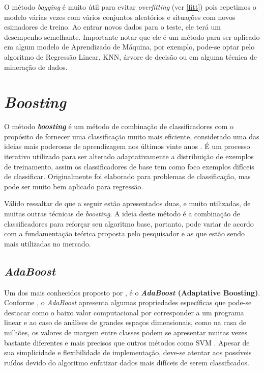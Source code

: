 \documentclass[
  openany]{book}
\begin{document}
O método \emph{bagging} é muito útil para evitar \emph{overfitting} (ver \ref{fitt}) pois repetimos o modelo várias vezes com vários conjuntos aleatórios e situações com novos esimadores de treino. Ao entrar novos dados para o teste, ele terá um desempenho semelhante. Importante notar que ele é um método para ser aplicado em algum modelo de Aprendizado de Máquina, por exemplo, pode-se optar pelo algoritmo de Regressão Linear, KNN, árvore de decisão ou em alguma técnica de mineração de dados.

\hypertarget{boost}{%
\section{\texorpdfstring{\emph{Boosting}}{Boosting}}\label{boost}}

O método \textbf{\emph{boosting}} \citep{freund1996experiments} é um método de combinação de classificadores com o propósito de fornecer uma classificação muito mais eficiente, considerado uma das ideias mais poderosas de aprendizagem nos últimos vinte anos \citep{hastie2009elements}. É um processo iterativo utilizado para ser alterado adaptativamente a distribuição de exemplos de treinamento, assim os classificadores de base tem como foco exemplos difíceis de classificar. Originalmente foi elaborado para problemas de classificação, mas pode ser muito bem aplicado para regressão.

Válido ressaltar de que a seguir estão apresentados duas, e muito utilizadas, de muitas outras técnicas de \emph{boosting}. A ideia deste método é a combinação de classificadores para reforçar seu algoritmo base, portanto, pode variar de acordo com a fundamentação teórica proposta pelo pesquisador e as que estão sendo mais utilizadas no mercado.

\hypertarget{adaboost}{%
\subsection{\texorpdfstring{\emph{AdaBoost}}{AdaBoost}}\label{adaboost}}

Um dos mais conhecidos proposto por \citet{freund1996experiments}, é o \textbf{\emph{AdaBoost} (Adaptative Boosting)}. Conforme \citep{freund1997decision}, o \emph{AdaBoost} apresenta algumas propriedades específicas que pode-se destacar como o baixo valor computacional por corresponder a um programa linear e ao caso de análises de grandes espaços dimensionais, como na casa de milhões, os valores de margem entre classes podem se apresentar muitas vezes bastante diferentes e mais precisos que outros métodos como SVM \citep{freund1999short, chaves2012estudo}. Apesar de sua simplicidade e flexibilidade de implementação, deve-se atentar aos possíveis ruídos devido do algoritmo enfatizar dados mais difíceis de serem classificados.
\end{document}

